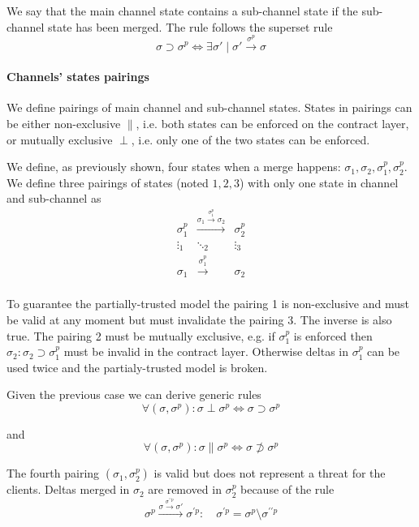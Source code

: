 \documentclass{llncs}
\begin{document}
We say that the main channel state contains a sub-channel state if the sub-channel state has been merged. The rule follows the superset rule
$$\sigma \supset \sigma^p \iff \exists \sigma' \mid \sigma' \xrightarrow{\sigma^p} \sigma$$

\paragraph{Channels' states pairings} We define pairings of main channel and sub-channel states. States in pairings can be either non-exclusive $\parallel$, i.e. both states can be enforced on the contract layer, or mutually exclusive $\perp$, i.e. only one of the two states can be enforced.

We define, as previously shown, four states when a merge happens: $\sigma_1, \sigma_2, \sigma^p_1, \sigma^p_2$. We define three pairings of states (noted $1, 2, 3$) with only one state in channel and sub-channel as
\begin{equation*}
    \begin{matrix}
        \sigma^p_1 & \xrightarrow{\sigma_1 \xrightarrow{\sigma^p_1} \sigma_2} & \sigma^p_2 \\
        \vdots_1 & \ddots_2 & \vdots_3 \\
        \sigma_1 & \xrightarrow{\sigma^p_1} & \sigma_2 \\
    \end{matrix}
\end{equation*}

To guarantee the partially-trusted model the pairing 1 is non-exclusive and must be valid at any moment but must invalidate the pairing 3. The inverse is also true. The pairing 2 must be mutually exclusive, e.g. if $\sigma^p_1$ is enforced then $\sigma_2 : \sigma_2 \supset \sigma^p_1$ must be invalid in the contract layer. Otherwise deltas in $\sigma^p_1$ can be used twice and the partialy-trusted model is broken.

Given the previous case we can derive generic rules
$$\forall (\sigma, \sigma^p) : \sigma \perp \sigma^p \iff \sigma \supset \sigma^p$$

and
$$\forall (\sigma, \sigma^p) : \sigma \parallel \sigma^p \iff \sigma \not \supset \sigma^p$$

The fourth pairing $(\sigma_1, \sigma^p_2)$ is valid but does not represent a threat for the clients. Deltas merged in $\sigma_2$ are removed in $\sigma^p_2$ because of the rule
$$\sigma^p \xrightarrow{\sigma \xrightarrow{\sigma^{\prime\prime p}} \sigma'} \sigma^{\prime p} : \quad \sigma^{\prime p} = \sigma^p \setminus \sigma^{\prime\prime p}$$
\end{document}
